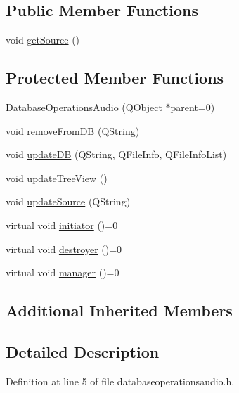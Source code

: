 \subsection*{Public Member Functions}
\begin{DoxyCompactItemize}
\item 
void \hyperlink{class_database_operations_audio_afd2ea7e19882b60d4b991875eb886347}{get\-Source} ()
\end{DoxyCompactItemize}
\subsection*{Protected Member Functions}
\begin{DoxyCompactItemize}
\item 
\hyperlink{class_database_operations_audio_a078a5fbf2535364118cea60e8fb739c4}{Database\-Operations\-Audio} (Q\-Object $\ast$parent=0)
\item 
void \hyperlink{class_database_operations_audio_a0e819c77ddae10bdaac2666e0be372a3}{remove\-From\-D\-B} (Q\-String)
\item 
void \hyperlink{class_database_operations_audio_ad0a8ec0e0472aed58a9927e00cd5a7fd}{update\-D\-B} (Q\-String, Q\-File\-Info, Q\-File\-Info\-List)
\item 
void \hyperlink{class_database_operations_audio_a42d73126a8b2822f84a040aa604f9925}{update\-Tree\-View} ()
\item 
void \hyperlink{class_database_operations_audio_a1dc402c2c29b384e1015dea77fcf3662}{update\-Source} (Q\-String)
\item 
virtual void \hyperlink{class_database_operations_audio_a80507c96dabef6ca3a06a0d3f83fb657}{initiator} ()=0
\item 
virtual void \hyperlink{class_database_operations_audio_ab4879167601725f2faf7a69d73aa2309}{destroyer} ()=0
\item 
virtual void \hyperlink{class_database_operations_audio_a7db082335a6a48ce277383f5382c15c2}{manager} ()=0
\end{DoxyCompactItemize}
\subsection*{Additional Inherited Members}


\subsection{Detailed Description}


Definition at line 5 of file databaseoperationsaudio.\-h.



